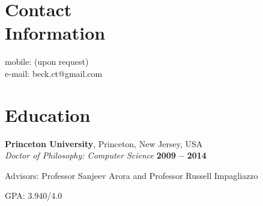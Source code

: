 \documentclass[margin,line]{resume}
\begin{document}
\begin{resume}

    \section{\mysidestyle Contact\\Information}

                                                          \hfill mobile: (upon request)          \vspace{0mm}\\\vspace{0mm}%
                                                          \hfill e-mail: beck.ct@gmail.com  \vspace{0mm}\\\vspace{-4.5mm}%





    \section{\mysidestyle Education}

    \textbf{Princeton University}, Princeton, New Jersey, USA \vspace{2mm}\\\vspace{1mm}%
    \textsl{Doctor of Philosophy: Computer Science} \hfill \textbf{ 2009 -- 2014 }\vspace{-3mm}\\\vspace{-1mm}%
    \begin{list2}
        \item Advisors:  Professor Sanjeev Arora and Professor Russell Impagliazzo
        \item GPA: 3.940/4.0
    \end{list2}\vspace{-1.5mm}


\end{resume}
\end{document}
